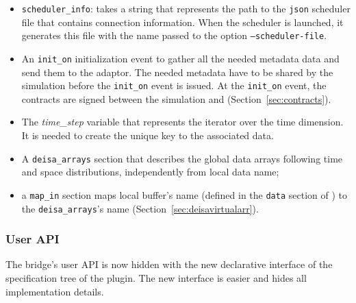 \begin{itemize}
    \item \texttt{scheduler\_info}: takes a string that represents the path to the \texttt{json} scheduler file that contains connection information. When the scheduler is launched, it generates this file with the name passed to the option \texttt{--scheduler-file}. 

    \item An \texttt{init\_on} initialization event to gather all the needed metadata data and send them to the \deisa adaptor. The needed metadata have to be shared by the simulation before the \texttt{init\_on} event is issued. At the \texttt{init\_on} event, the contracts are signed between the simulation and \dask (Section~\ref{sec:contracts}).
    
    \item The \textit{time\_step} variable that represents the iterator over the time dimension. It is needed to create the unique key to the associated data.  
    
    \item A \texttt{deisa\_arrays} section that describes the global data arrays following time and space distributions, independently from local data name; 
    
    \item a \texttt{map\_in} section maps local buffer's name (defined in the \texttt{data} section of \pdi) to the \texttt{deisa\_arrays}'s name (Section~\ref{sec:deisavirtualarr}). 
\end{itemize}


\subsubsection{User API}

The bridge's user API is now hidden with the new declarative interface of the specification tree of the \deisa plugin. The new interface is easier and hides all implementation details.

